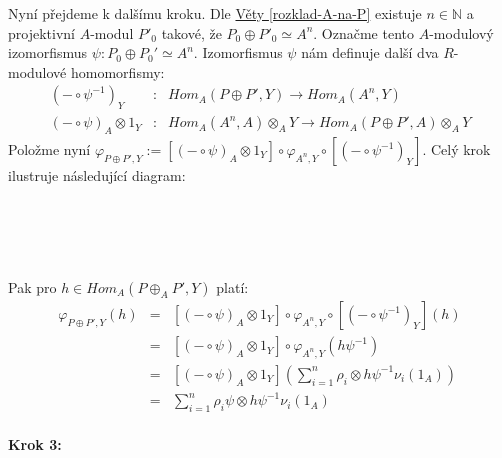        Nyní přejdeme k dalšímu kroku. 
       Dle \hyperref[rozklad-A-na-P]{Věty \ref*{rozklad-A-na-P}} 
       existuje $n\in \mathbb N$ a projektivní $A$-modul $P'_0$ takové, že
       $P_0\oplus P'_0\simeq A^n$. Označme tento $A$-modulový izomorfismus 
       $\psi: P_0\oplus P_0'\simeq A^n$. Izomorfismus $\psi$ nám definuje 
       další dva $R$-modulové homomorfismy:  
       \begin{eqnarray}         
          (-\circ \psi^{-1})_Y&:&
          Hom_A(P\oplus P',Y
          )\rightarrow Hom_A(A^n,Y) \nonumber \\
         (-\circ\psi)_A\otimes 1_Y&:&
         Hom_A(A^n,A)\otimes_A Y
         \rightarrow 
         Hom_A(P\oplus P',A)\otimes_A Y \nonumber 
       \end{eqnarray}
       Položme nyní $
         \varphi_{P\oplus P',Y}:=
         [(-\circ\psi)_A\otimes 1_Y] \circ
         \varphi_{A^n,Y} \circ
         [(-\circ \psi^{-1})_Y]
       $. Celý krok ilustruje následující diagram:\\\\   
         \centerline{}\\\\\\
       Pak pro $h\in Hom_A(P\oplus_A P',Y)$ platí: 
       \begin{eqnarray}
          \varphi_{P\oplus P',Y}(h)&=&[(-\circ\psi)_A\otimes 1_Y]\circ\varphi_{A^n,Y}\circ[(-\circ\psi^{-1})_Y](h) \nonumber \\
          &=& [(-\circ\psi)_A\otimes 1_Y]\circ\varphi_{A^n,Y}(h\psi^{-1})  \nonumber \\
          &=& [(-\circ\psi)_A\otimes 1_Y](\sum_{i=1}^n\rho_i\otimes h\psi^{-1}\nu_i(1_A))  \nonumber \\
          &=& \sum_{i=1}^n\rho_i\psi\otimes h\psi^{-1}\nu_i(1_A)  \nonumber
       \end{eqnarray}
       
       \paragraph{Krok 3:}
       
